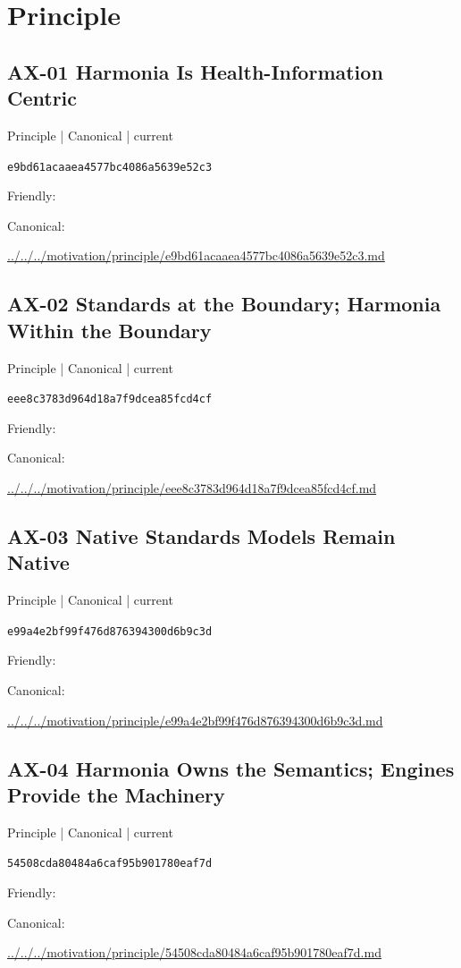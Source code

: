 \documentclass[10pt,a4paper]{article}
\begin{document}
\section*{Principle}
\subsection*{AX-01 Harmonia Is Health-Information Centric}
{\small Principle | Canonical | current}\par
\texttt{e9bd61acaaea4577bc4086a5639e52c3}\par
Friendly: \par
Canonical: \par
{\footnotesize\url{../../../motivation/principle/e9bd61acaaea4577bc4086a5639e52c3.md}}\par
\subsection*{AX-02 Standards at the Boundary; Harmonia Within the Boundary}
{\small Principle | Canonical | current}\par
\texttt{eee8c3783d964d18a7f9dcea85fcd4cf}\par
Friendly: \par
Canonical: \par
{\footnotesize\url{../../../motivation/principle/eee8c3783d964d18a7f9dcea85fcd4cf.md}}\par
\subsection*{AX-03 Native Standards Models Remain Native}
{\small Principle | Canonical | current}\par
\texttt{e99a4e2bf99f476d876394300d6b9c3d}\par
Friendly: \par
Canonical: \par
{\footnotesize\url{../../../motivation/principle/e99a4e2bf99f476d876394300d6b9c3d.md}}\par
\subsection*{AX-04 Harmonia Owns the Semantics; Engines Provide the Machinery}
{\small Principle | Canonical | current}\par
\texttt{54508cda80484a6caf95b901780eaf7d}\par
Friendly: \par
Canonical: \par
{\footnotesize\url{../../../motivation/principle/54508cda80484a6caf95b901780eaf7d.md}}\par
\end{document}
